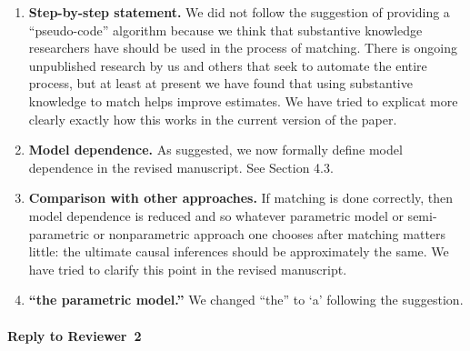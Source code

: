 \documentclass[11pt]{article}
\begin{document}
\begin{enumerate}
\item {\bf Step-by-step statement.} We did not follow the suggestion
  of providing a ``pseudo-code'' algorithm because we think that
  substantive knowledge researchers have should be used in the process
  of matching.  There is ongoing unpublished research by us and others
  that seek to automate the entire process, but at least at present we
  have found that using substantive knowledge to match helps improve
  estimates.  We have tried to explicat more clearly exactly how this
  works in the current version of the paper.
  
\item {\bf Model dependence.} As suggested, we now formally define
  model dependence in the revised manuscript. See Section 4.3.
  
\item {\bf Comparison with other approaches.} If matching is done
  correctly, then model dependence is reduced and so whatever
  parametric model or semi-parametric or nonparametric approach one
  chooses after matching matters little: the ultimate causal
  inferences should be approximately the same.  We have tried to
  clarify this point in the revised manuscript.


\item {\bf ``the parametric model.''} We changed ``the'' to `a'
  following the suggestion.
\end{enumerate}


\paragraph{Reply to Reviewer~2}
\end{document}

